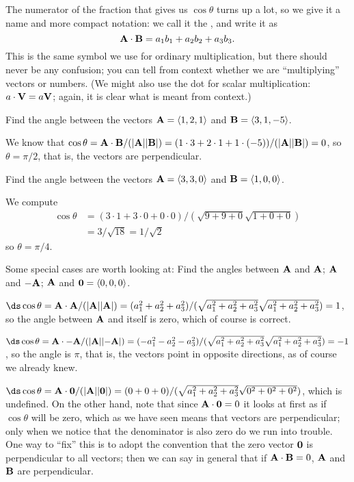 The numerator of the fraction that gives us $\cos\theta$ turns up a
lot, so we give it a name and more compact notation: we call it
the , and write it as
$${\bf A}\cdot{\bf B} = a_1b_1+a_2b_2+a_3b_3.$$
This is the same symbol we use for ordinary multiplication, but there
should never be any confusion; you can tell from context whether we
are ``multiplying'' vectors or numbers. (We might also use the dot for
scalar multiplication: $a\cdot{\bf V}=a{\bf V}$; again, it is clear
what is meant from context.)

\begin{example}{}{}
Find the angle between the vectors ${\bf A}=\langle 1,2,1\rangle$ and
${\bf B}=\langle 3,1,-5\rangle$.
\end{example}
\begin{solution}
We know that
$\cos\theta={\bf A}\cdot{\bf B}/(|{\bf A}||{\bf B}|)=
(1\cdot3 + 2\cdot1 + 1\cdot(-5))/(|{\bf A}||{\bf B}|)=0$, so
$\theta=\pi/2$, that is, the vectors are perpendicular.
\end{solution}

\begin{example}{}{}
Find the angle between the vectors ${\bf A}=\langle 3,3,0\rangle$ and
${\bf B}=\langle 1,0,0\rangle$.
\end{example}
\begin{solution}
We compute
\begin{align*}
\cos\theta &= (3\cdot1 + 3\cdot0 + 0\cdot0)/(\sqrt{9+9+0}\sqrt{1+0+0})	\\
&= 3/\sqrt{18} = 1/\sqrt2
\end{align*}
so $\theta=\pi/4$.
\end{solution}

\begin{example}{}{}
Some special cases are worth looking at: Find the angles
between ${\bf A}$ and ${\bf A}$; ${\bf A}$ and ${\bf -A}$;  ${\bf A}$
and ${\bf 0}=\langle 0,0,0\rangle$.

$\ds \cos\theta= {\bf A}\cdot{\bf A}/(|{\bf A}||{\bf A}|)=(a_1^2+a_2^2+a_3^2)/
(\sqrt{a_1^2+a_2^2+a_3^2}\sqrt{a_1^2+a_2^2+a_3^2})=1$, so the angle
between ${\bf A}$ and itself is zero, which of course is correct.

$\ds\cos\theta={\bf A}\cdot{\bf -A}/(|{\bf A}||{\bf -A}|)=(-a_1^2-a_2^2-a_3^2)/
(\sqrt{a_1^2+a_2^2+a_3^2}\sqrt{a_1^2+a_2^2+a_3^2})=-1$, so the angle
is $\pi$, that is, the vectors point in opposite directions, as of
course we already knew.

$\ds \cos\theta= {\bf A}\cdot{\bf 0}/(|{\bf A}||{\bf 0}|)=(0+0+0)/
(\sqrt{a_1^2+a_2^2+a_3^2}\sqrt{0^2+0^2+0^2})$, which is undefined.
On the other hand, note that since ${\bf A}\cdot{\bf 0}=0$ it looks
at first as if $\cos\theta$ will be zero, which as we have seen means
that vectors are perpendicular; only when we notice that the
denominator is also zero do we run into trouble. One way to ``fix''
this is to adopt the convention that the zero vector ${\bf 0}$ is
perpendicular to all vectors; then we can say in general that if
${\bf A}\cdot{\bf B}=0$, $\bf A$ and $\bf B$ are perpendicular.
\end{example}

